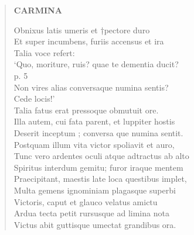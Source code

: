 \documentclass[11pt, a4paper]{report}
\begin{document}
\begin{verse}
     \marginpar{[38]} \begin{center} \textbf{CARMINA} \end{center}Obnixus latis umeris et †pectore duro \\ Et super incumbens, furiis accensus et ira \\ Talia voce refert: \\ ‘Quo, moriture, ruis? quae te dementia ducit? \\ p. 5 \\ Non vires alias conversaque numina sentis? \\ Cede locis!’ \\ Talia fatus erat pressoque obmutuit ore. \\ Illa autem, cui fata parent, et luppiter hostis \\ Deserit  \lbrack inceptum \rbrack ; conversa \lbrack que \rbrack  numina sentit. \\ Postquam illum vita victor spoliavit et auro, \\ Tunc vero ardentes oculi atque adtractus ab alto \\ Spiritus interdum gemitu; furor iraque mentem \\ Praecipitant, maestis late loca questibus implet, \\ Multa gemens ignominiam plagasque superbi \\ Victoris, caput  \lbrack et \rbrack  glauco velatus amictu \\ Ardua tecta petit rursusque ad limina nota \\ Victus abit guttisque umectat grandibus ora. \\ 
      \end{verse}
  
\end{document}
